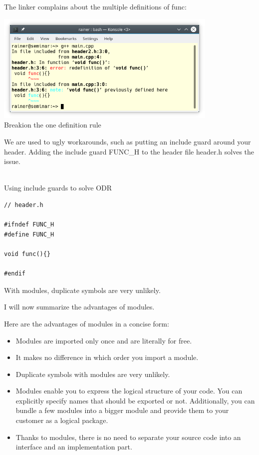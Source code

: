 The linker complains about the multiple definitions of func:

\begin{center}
\includegraphics[width=0.8\textwidth]{content/3/chapter4/images/16.png}\\
Breakion the one definition rule
\end{center}

We are used to ugly workarounds, such as putting an include guard around your header. Adding the include guard FUNC\_H to the header file header.h solves the issue.

\hspace*{\fill} \\ %
\noindent
Using include guards to solve ODR
\begin{lstlisting}[style=styleCXX]
// header.h

#ifndef FUNC_H
#define FUNC_H

void func(){}

#endif
\end{lstlisting}

With modules, duplicate symbols are very unlikely.

I will now summarize the advantages of modules.


Here are the advantages of modules in a concise form:

\begin{itemize}
\item 
Modules are imported only once and are literally for free.

\item 
It makes no difference in which order you import a module.

\item 
Duplicate symbols with modules are very unlikely.

\item 
Modules enable you to express the logical structure of your code. You can explicitly specify names that should be exported or not. Additionally, you can bundle a few modules into a bigger module and provide them to your customer as a logical package.

\item 
Thanks to modules, there is no need to separate your source code into an interface and an implementation part.
\end{itemize}

